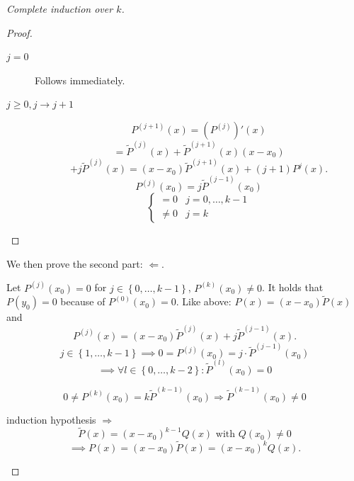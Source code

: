 \documentclass[a4paper,landscape,twocolumn]{article}
\theoremstyle{definition}
\newcommand\set[1]{\left\{#1\right\}}
\begin{document}
\begin{proof}[Complete induction over $k$]
\begin{description}
\begin{proof}
\begin{description}
          \item[$j=0$]
            Follows immediately.
          \item[$j \geq 0, j \to j+1$]
            \[ P^{(j+1)}(x) = \left(P^{(j)}\right)'(x) \]
            \[
              = \tilde{P}^{(j)}(x) + \tilde{P}^{(j+1)}(x) (x - x_0)
            \] \[
              + j \tilde{P}^{(j)}(x)
              = (x - x_0) \tilde{P}^{(j+1)}(x) + (j+1)P^{j}(x).
            \] \[
              P^{(j)}(x_0) = j \tilde{P}^{(j-1)}(x_0)
            \] \[
              \begin{cases}
                = 0 & j = 0,\ldots,k-1 \\
                \neq 0 & j = k
              \end{cases}
            \]
        \end{description}
      \end{proof}

      We then prove the second part: $\Leftarrow$.

      Let $P^{(j)}(x_0) = 0$ for $j \in \set{0,\ldots,k-1}$, $P^{(k)}(x_0) \neq 0$.
      It holds that $P(y_0) = 0$ because of $P^{(0)}(x_0) = 0$.
      Like above: $P(x) = (x - x_0) \tilde{P}(x)$ and
      \[ P^{(j)}(x) = (x - x_0) \tilde{P}^{(j)}(x) + j \tilde{P}^{(j-1)}(x). \]
      \[ j \in \set{1,\ldots,k-1} \implies 0 = P^{(j)}(x_0) = j \cdot \tilde{P}^{(j-1)}(x_0) \]
      \[ \implies \forall l \in \set{0,\ldots,k-2}: \tilde{P}^{(l)}(x_0) = 0 \]

      \[ 0 \neq P^{(k)}(x_0) = k \tilde{P}^{(k-1)}(x_0) \Rightarrow \tilde{P}^{(k-1)}(x_0) \neq 0 \]

      induction hypothesis $\Rightarrow$
      \[ \tilde{P}(x) = (x - x_0)^{k-1} Q(x) \text{ with } Q(x_0) \neq 0 \]
      \[ \implies P(x) = (x - x_0) \tilde{P}(x) = (x - x_0)^k Q(x). \]
  \end{description}
\end{proof}
\end{document}
